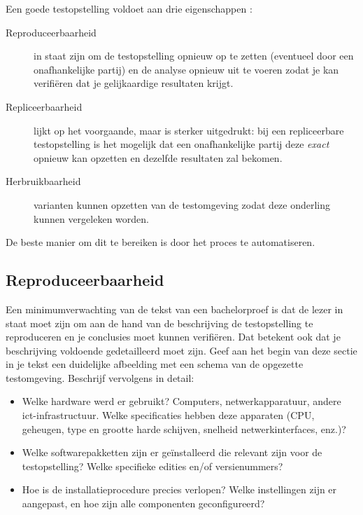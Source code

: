 Een goede testopstelling voldoet aan drie eigenschappen \autocite{Liberman2015}:

\begin{description}
  \item[Reproduceerbaarheid] in staat zijn om de testopstelling opnieuw op te zetten (eventueel door een onafhankelijke partij) en de analyse opnieuw uit te voeren zodat je kan verifiëren dat je gelijkaardige resultaten krijgt.
  \item[Repliceerbaarheid] lijkt op het voorgaande, maar is sterker uitgedrukt: bij een repliceerbare testopstelling is het mogelijk dat een onafhankelijke partij deze \textit{exact} opnieuw kan opzetten en dezelfde resultaten zal bekomen.
  \item[Herbruikbaarheid] varianten kunnen opzetten van de testomgeving zodat deze onderling kunnen vergeleken worden.
\end{description}

De beste manier om dit te bereiken is door het proces te automatiseren.

\subsection{Reproduceerbaarheid}
\label{ssec:reproduceerbaarheid}

Een minimumverwachting van de tekst van een bachelorproef is dat de lezer in staat moet zijn om aan de hand van de beschrijving de testopstelling te reproduceren en je conclusies moet kunnen verifiëren. Dat betekent ook dat je beschrijving voldoende gedetailleerd moet zijn. Geef aan het begin van deze sectie in je tekst een duidelijke afbeelding met een schema van de opgezette testomgeving. Beschrijf vervolgens in detail:

\begin{itemize}
  \item Welke hardware werd er gebruikt? Computers, netwerkapparatuur, andere ict-infrastructuur. Welke specificaties hebben deze apparaten (CPU, geheugen, type en grootte harde schijven, snelheid netwerkinterfaces, enz.)?
  \item Welke softwarepakketten zijn er geïnstalleerd die relevant zijn voor de testopstelling? Welke specifieke edities en/of versienummers?
  \item Hoe is de installatieprocedure precies verlopen? Welke instellingen zijn er aangepast, en hoe zijn alle componenten geconfigureerd?
\end{itemize}

